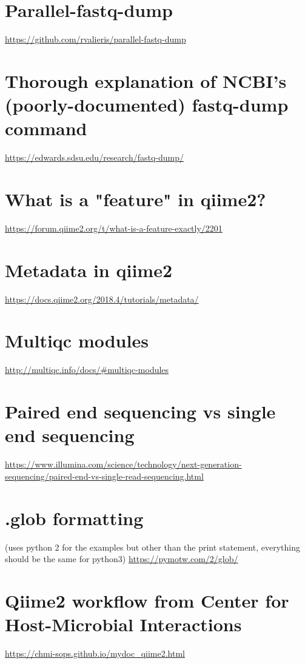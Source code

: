 \begin{fullpage}
    \section{Parallel-fastq-dump}
    \url{https://github.com/rvalieris/parallel-fastq-dump}
    
    \section{Thorough explanation of NCBI's (poorly-documented) fastq-dump command}
    \url{https://edwards.sdsu.edu/research/fastq-dump/}

    
    \section{What is a "feature" in qiime2?}
    \url{https://forum.qiime2.org/t/what-is-a-feature-exactly/2201}
    
    \section{Metadata in qiime2}
    \url{https://docs.qiime2.org/2018.4/tutorials/metadata/}

\section{Multiqc modules}
\url{http://multiqc.info/docs/#multiqc-modules}

\section{Paired end sequencing vs single end sequencing}
\small \url{https://www.illumina.com/science/technology/next-generation-sequencing/paired-end-vs-single-read-sequencing.html}

\section{.glob formatting} 
(uses python 2 for the examples but other than the print statement, everything should be the same for python3)
\url{https://pymotw.com/2/glob/}

\section{Qiime2 workflow from Center for Host-Microbial Interactions}
\url{https://chmi-sops.github.io/mydoc_qiime2.html}


\end{fullpage}
